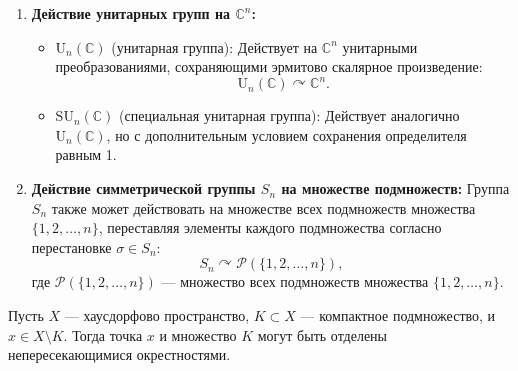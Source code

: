 \begin{example}
\begin{enumerate}
		\item \textbf{Действие унитарных групп на $ \mathbb{C}^n $:}
		\begin{itemize}
			\item $ \mathrm{U}_n(\mathbb{C}) $ (унитарная группа): Действует на $ \mathbb{C}^n $ унитарными преобразованиями, сохраняющими эрмитово скалярное произведение:
			\[
			\mathrm{U}_n(\mathbb{C}) \curvearrowright \mathbb{C}^n.
			\]
			\item $ \mathrm{SU}_n(\mathbb{C}) $ (специальная унитарная группа): Действует аналогично $ \mathrm{U}_n(\mathbb{C}) $, но с дополнительным условием сохранения определителя равным 1.
		\end{itemize}
	
		\item \textbf{Действие симметрической группы $ S_n $ на множестве подмножеств:}
		Группа $ S_n $ также может действовать на множестве всех подмножеств множества $ \{1, 2, \ldots, n\} $, переставляя элементы каждого подмножества согласно перестановке $ \sigma \in S_n $:
		\[
		S_n \curvearrowright \mathcal{P}(\{1, 2, \ldots, n\}),
		\]
		где $ \mathcal{P}(\{1, 2, \ldots, n\}) $ — множество всех подмножеств множества $ \{1, 2, \ldots, n\} $.
	
	\end{enumerate}
	\end{example}




\begin{lemma}
	Пусть $ X $ — хаусдорфово пространство, $ K \subset X $ — компактное подмножество, и $ x \in X \setminus K $. Тогда точка $ x $ и множество $ K $ могут быть отделены непересекающимися окрестностями.
	\end{lemma}
	
